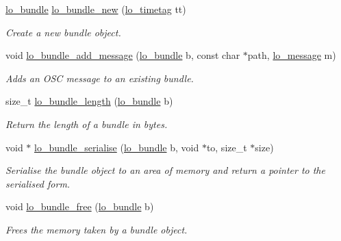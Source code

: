 \begin{CompactItemize}
\hyperlink{lo__types_8h_96254950ad34e9cfbf8a6613fc74025b}{lo\_\-bundle} \hyperlink{group__liblolowlevel_g330a4a4e6227b185b3ec6219ff3e2859}{lo\_\-bundle\_\-new} (\hyperlink{structlo__timetag}{lo\_\-timetag} tt)
\begin{CompactList}\small\item\em Create a new bundle object. \item\end{CompactList}\item 
void \hyperlink{group__liblolowlevel_g44e0e03554e91e76e5856e99fbb8afad}{lo\_\-bundle\_\-add\_\-message} (\hyperlink{lo__types_8h_96254950ad34e9cfbf8a6613fc74025b}{lo\_\-bundle} b, const char $\ast$path, \hyperlink{lo__types_8h_d126083c98d941f00eb72d1690b38d63}{lo\_\-message} m)
\begin{CompactList}\small\item\em Adds an OSC message to an existing bundle. \item\end{CompactList}\item 
size\_\-t \hyperlink{group__liblolowlevel_ga105f1c5b97a16beabdb6b4ab7af2b46}{lo\_\-bundle\_\-length} (\hyperlink{lo__types_8h_96254950ad34e9cfbf8a6613fc74025b}{lo\_\-bundle} b)
\begin{CompactList}\small\item\em Return the length of a bundle in bytes. \item\end{CompactList}\item 
void $\ast$ \hyperlink{group__liblolowlevel_gea61bc73c281efe4e2f95456e4d0f9f5}{lo\_\-bundle\_\-serialise} (\hyperlink{lo__types_8h_96254950ad34e9cfbf8a6613fc74025b}{lo\_\-bundle} b, void $\ast$to, size\_\-t $\ast$size)
\begin{CompactList}\small\item\em Serialise the bundle object to an area of memory and return a pointer to the serialised form. \item\end{CompactList}\item 
void \hyperlink{group__liblolowlevel_g2ba37901788d863d08a2b7d6ca4250e6}{lo\_\-bundle\_\-free} (\hyperlink{lo__types_8h_96254950ad34e9cfbf8a6613fc74025b}{lo\_\-bundle} b)
\begin{CompactList}\small\item\em Frees the memory taken by a bundle object. \item\end{CompactList}\item 

\end{CompactItemize}
